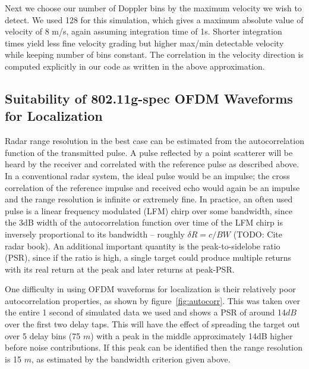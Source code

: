 \documentclass[article,11pt,onecolumn,final]{IEEEtran}
\begin{document}
Next we choose our number of Doppler bins by the maximum velocity we wish to detect. We used 128 for this simulation, which gives a maximum absolute value of velocity of 8 m/s, again assuming integration time of 1s. Shorter integration times yield less fine velocity grading but higher max/min detectable velocity while keeping number of bins constant. The correlation in the velocity direction is computed explicitly in our code as written in the above approximation.

\subsection{Suitability of 802.11g-spec OFDM Waveforms for Localization}
Radar range resolution in the best case can be estimated from the autocorrelation function of the transmitted pulse. A pulse reflected by a point scatterer will be heard by the receiver and correlated with the reference pulse as described above. In a conventional radar system, the ideal pulse would be an impulse; the cross correlation of the reference impulse and received echo would again be an impulse and the range resolution is infinite or extremely fine. In practice, an often used pulse is a linear frequency modulated (LFM) chirp over some bandwidth, since the 3dB width of the autocorrelation function over time of the LFM chirp is inversely proportional to its bandwidth -- roughly $\delta R = c / BW$ (TODO: Cite radar book). An additional important quantity is the peak-to-sidelobe ratio (PSR), since if the ratio is high, a single target could produce multiple returns with its real return at the peak and later returns at peak-PSR.

One difficulty in using OFDM waveforms for localization is their relatively poor autocorrelation properties, as shown by figure~\ref{fig:autocorr}. This was taken over the entire 1 second of simulated data we used and shows a PSR of around 14$dB$ over the first two delay taps. This will have the effect of spreading the target out over 5 delay bins (75 $m$) with a peak in the middle approximately 14dB higher before noise contributions. If this peak can be identified then the range resolution is 15 $m$, as estimated by the bandwidth criterion given above. 
\end{document}
